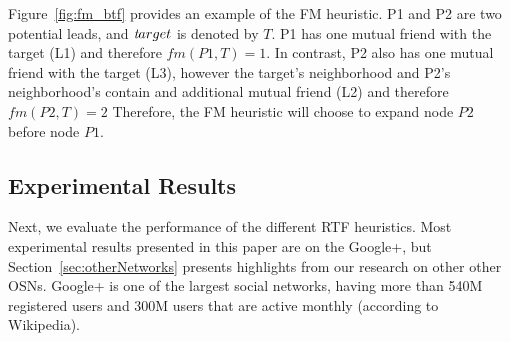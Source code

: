 \documentclass[prodmode,acmtecs]{acmsmall} %
\newcommand{\note}[2]{\textbf{\textsc{#1} says: \textit{#2}}}
\newcommand{\target}{{\textit target}}
\begin{document}
Figure~\ref{fig:fm_btf} provides an example of the FM heuristic. P1 and P2 are two potential leads, and $\target$ is denoted by $T$. P1 has one mutual friend with the target (L1) and therefore $fm(P1,T)=1$. In contrast, P2 also has one mutual friend with the target (L3), however the target's neighborhood and P2's neighborhood's contain and additional mutual friend (L2) and therefore $fm(P2,T)=2$
Therefore, the FM  heuristic will choose to expand node $P2$ before node $P1$.





\subsection{Experimental Results}
\label{sec:btf-experimentalResults}
Next, we evaluate the performance of the different RTF heuristics. Most experimental results presented in this paper are on the Google+, but Section~\ref{sec:otherNetworks} presents highlights from our research on other other OSNs. Google+ is one of the largest social networks, having more than 540M registered users and 300M users that are active monthly (according to Wikipedia). 



\end{document}
